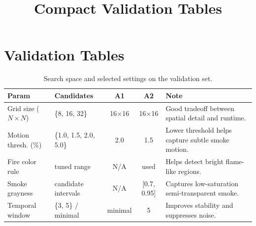 \documentclass[10pt,a4paper]{article}
\begin{document}
	\title{Compact Validation Tables}
	\author{}
	\date{}
	\maketitle

	\section*{Validation Tables}

	\begin{table}[ht]
		\centering
		\caption{Search space and selected settings on the validation set.}
		\label{tab:hyperparam_search}
		\scriptsize
		\setlength{\tabcolsep}{4pt}
		\begin{tabularx}{\columnwidth}{l l c c X}
			\toprule
			\textbf{Param} & \textbf{Candidates} & \textbf{A1} & \textbf{A2} & \textbf{Note} \\
			\midrule
			Grid size ($N \times N$) & \{8, 16, 32\} & 16$\times$16 & 16$\times$16 & Good tradeoff between spatial detail and runtime. \\
			Motion thresh. (\%) & \{1.0, 1.5, 2.0, 5.0\} & 2.0 & 1.5 & Lower threshold helps capture subtle smoke motion. \\
			Fire color rule & tuned range & N/A & used & Helps detect bright flame-like regions. \\
			Smoke grayness & candidate intervals & N/A & [0.7, 0.95] & Captures low-saturation semi-transparent smoke. \\
			Temporal window & \{3, 5\} / minimal & minimal & 5 & Improves stability and suppresses noise. \\
			\bottomrule
		\end{tabularx}
	\end{table}
\end{document}
